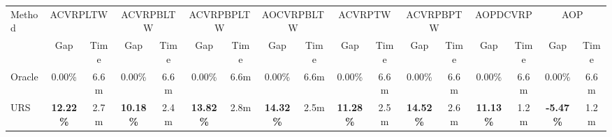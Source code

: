 \documentclass{article}
\theoremstyle{plain}
\theoremstyle{definition}
\theoremstyle{remark}
\begin{document}
\begin{table}[t]
{\begin{tabular}{l|cc|cc|cc|cc|cc|cc|cc|cc}
    \midrule
    \midrule
    \multirow{2}[2]{*}{Method} & \multicolumn{2}{c|}{ACVRPLTW} & \multicolumn{2}{c|}{ACVRPBLTW} & \multicolumn{2}{c|}{ACVRPBPLTW} & \multicolumn{2}{c|}{AOCVRPBLTW} & \multicolumn{2}{c|}{ACVRPTW} & \multicolumn{2}{c|}{ ACVRPBPTW} & \multicolumn{2}{c|}{AOPDCVRP} & \multicolumn{2}{c}{AOP} \\
          & Gap   & Time  & Gap   & Time  & Gap   & Time  & Gap   & Time  & Gap   & Time  & Gap   & Time  & Gap   & Time  & Gap   & Time \\
    \midrule
    Oracle  & 0.00\% & 6.6m  & 0.00\% & 6.6m  & 0.00\% & 6.6m  & 0.00\% & 6.6m  & 0.00\% & 6.6m  & 0.00\% & 6.6m  & 0.00\% & 6.6m  & 0.00\% & 6.6m \\
    URS   & \cellcolor[HTML]{D0CECE}\textbf{12.22\%} & 2.7m  & \cellcolor[HTML]{D0CECE}\textbf{10.18\%} & 2.4m  & \cellcolor[HTML]{D0CECE}\textbf{13.82\%} & 2.8m  & \cellcolor[HTML]{D0CECE}\textbf{14.32\%} & 2.5m  & \cellcolor[HTML]{D0CECE}\textbf{11.28\%} & 2.5m  & \cellcolor[HTML]{D0CECE}\textbf{14.52\%} & 2.6m  & \cellcolor[HTML]{D0CECE}\textbf{11.13\%} & 1.2m  & \cellcolor[HTML]{D0CECE}\textbf{-5.47\%} & 1.2m \\
    \bottomrule[0.5mm]
    \end{tabular}%
    }
     
  \label{tab:zero_shot_main_paper}%
\end{table}%
\end{document}
